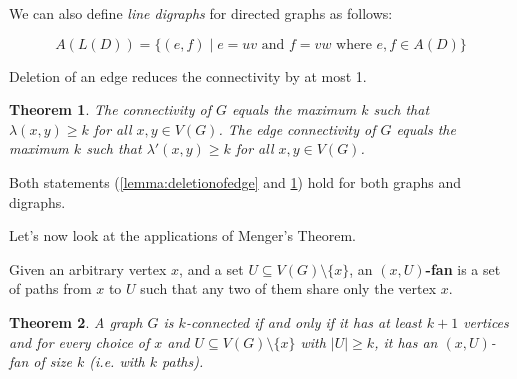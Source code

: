 \documentclass{Book}
\newtheorem{theorem}{Theorem}
\begin{document}
We can also define \textit{line digraphs} for directed graphs as follows:

\begin{equation*}
	A(L(D)) = \{(e,f) \mid e = uv \text{ and } f = vw \text{ where } e, f \in A(D)\}
\end{equation*}

\begin{lemma}
	\label{lemma:deletionofedge}
	Deletion of an edge reduces the connectivity by at most 1.
\end{lemma}

\begin{theorem}
	\label{the:coinnectivity}
	The connectivity of $G$ equals the maximum $k$ such that \(\lambda(x,y) \ge k\) for all $x,y \in V(G)$. The edge connectivity of $G$ equals the maximum $k$ such that $\lambda'(x,y) \ge k$ for all $x,y \in V(G)$.
\end{theorem}

Both statements (\ref{lemma:deletionofedge} and \ref{the:coinnectivity}) hold for both graphs and digraphs.

Let's now look at the applications of Menger's Theorem.

Given an arbitrary vertex $x$, and a set $U \subseteq V(G) \setminus \{x\}$, an $(x,U)$\textbf{-fan} is a set of paths from $x$ to $U$ such that any two of them share only the vertex $x$.

\begin{theorem}
	A graph $G$ is $k$-connected if and only if it has at least $k+1$ vertices and for every choice of $x$ and $U \subseteq V(G) \setminus \{x\}$ with $|U| \ge k$, it has an $(x,U)$-fan of size $k$ (i.e. with $k$ paths).
\end{theorem}
\end{document}
